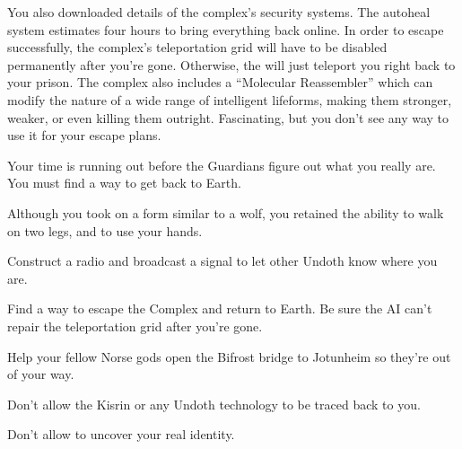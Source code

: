 \documentclass[char]{guardians}
\begin{document}
You also downloaded details of the complex's security systems. The autoheal system estimates four hours to bring everything back online. In order to escape successfully, the complex's teleportation grid will have to be disabled permanently after you're gone. Otherwise, the \cWarden{} will just teleport you right back to your prison. The complex also includes a ``Molecular Reassembler'' which can modify the nature of a wide range of intelligent lifeforms, making them stronger, weaker, or even killing them outright. Fascinating, but you don't see any way to use it for your escape plans.




Your time is running out before the Guardians figure out what you really are. You must find a way to get back to Earth.



\begin{itemz}[Notes]
  \item Although you took on a form similar to a wolf, you retained the ability to walk on two legs, and to use your hands.
\end{itemz}

\begin{itemz}[Goals]
  \item Construct a radio and broadcast a signal to let other Undoth know where you are.
  \item Find a way to escape the Complex and return to Earth. Be sure the AI can't repair the teleportation grid after you're gone.
  \item Help your fellow Norse gods open the Bifrost bridge to Jotunheim so they're out of your way.
  \item Don't allow the Kisrin or any Undoth technology to be traced back to you.
  \item Don't allow \cAmaterasu{} to uncover your real identity.
\end{itemz}
\end{document}
